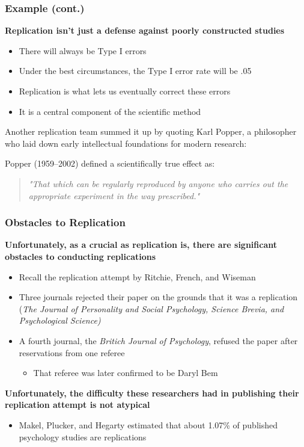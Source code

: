 \documentclass[10pt, block=fill]{beamer}
\begin{document}
\begin{frame}
    \frametitle{Example (cont.)}
    
    \textbf{Replication isn't just a defense against poorly constructed studies}
    \begin{itemize}
        \item There will always be Type I errors
        \item Under the best circumstances, the Type I error rate will be .05
        \item Replication is what lets us eventually correct these errors
        \item It is a central component of the scientific method
    \end{itemize}

    \vspace{0.25in}
    
    Another replication team summed it up by quoting Karl Popper, a philosopher who laid down early intellectual foundations for modern research:
    
    Popper (1959–2002) defined a scientifically true effect as:
    \begin{quote}
        \textit{"That which can be regularly reproduced by anyone who carries out the appropriate experiment in the way prescribed." }
    \end{quote}

\end{frame}


\begin{frame}
    \frametitle{Obstacles to Replication}
    
    \textbf{Unfortunately, as a crucial as replication is, there are significant obstacles to conducting replications}
    \begin{itemize}
        \item Recall the replication attempt by Ritchie, French, and Wiseman
        \item Three journals rejected their paper on the grounds that it was a replication (\textit{The Journal of Personality and Social Psychology, Science Brevia, and Psychological Science)  }
        \item A fourth journal, the \textit{Britich Journal of Psychology}, refused the paper after reservations from one referee
        \begin{itemize}
            \item That referee was later confirmed to be Daryl Bem
        \end{itemize}
    \end{itemize}
    
        \textbf{Unfortunately, the difficulty these researchers had in publishing their replication attempt is not atypical}
    \begin{itemize}
        \item Makel, Plucker, and Hegarty estimated that about 1.07\% of published psychology studies are replications
    \end{itemize}
    
\end{frame}
\end{document}
